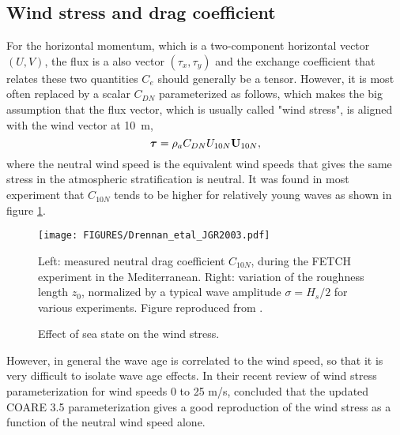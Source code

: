 \subsection{Wind stress and drag coefficient}
For the horizontal momentum, which is a two-component horizontal vector $(U,V)$, the flux is a also vector $(\tau_x,\tau_y)$ and the exchange coefficient that relates these two quantities $C_e$ should generally be a tensor. However, it is most often replaced by a scalar $C_{DN}$ parameterized as follows, which makes the big assumption that the flux vector, which is usually called "wind stress", is aligned with the wind vector at 10~m,  
\begin{equation}
 {\bm{\tau}}=\rho_a C_{DN} U_{10N} \mathbf{U}_{10N},
\end{equation}
where the neutral wind speed is the equivalent wind speeds that gives the same stress in the atmospheric stratification is neutral. It was found in most experiment that $C_{10N}$ tends to be higher for relatively young waves as shown in figure \ref{Drennanetal2003}.
\begin{figure}
\centerline{\texttt{[image: FIGURES/Drennan\_etal\_JGR2003.pdf]}}
  \caption{Effect of sea state on the wind stress.}{Left: measured neutral drag coefficient  $C_{10N}$, 
  during the  FETCH experiment in the Mediterranean. Right: variation of the roughness length  $z_0$, normalized by a typical wave amplitude $\sigma=H_s/2$ for various experiments. Figure reproduced from \cite{Drennan&al.2003}.}
\label{Drennanetal2003}
\end{figure}

However, in general the wave age is correlated to the wind speed, so that it is very difficult to isolate wave age effects. In their recent review of wind stress parameterization for wind speeds 0 to 25 m/s, \cite{Edson&al.2013} concluded that the updated COARE 3.5 parameterization gives a good reproduction of the wind stress as a function of the neutral wind speed alone. 

